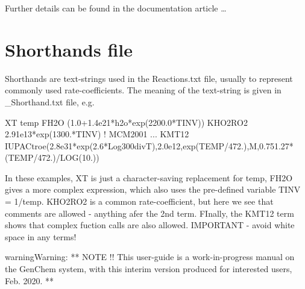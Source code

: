 \documentclass[a4paper,10pt,english]{sphinxmanual}
\begin{document}
Further details can be found in the documentation article …


\section{Shorthands file}
\label{\detokenize{GenChemDoc_chem:shorthands-file}}
Shorthands are text-strings used in the Reactions.txt file, usually to represent commonly used rate-coefficients. The meaning of the text-string is given in \_Shorthand.txt file, e.g.

\begin{sphinxVerbatim}[commandchars=\\\{\}]
XT           temp
FH2O         (1.0+1.4e\PYGZhy{}21*h2o*exp(2200.0*TINV))
KHO2RO2      2.91e\PYGZhy{}13*exp(1300.*TINV) ! MCM2001 ...
KMT12        IUPAC\PYGZus{}troe(2.8e\PYGZhy{}31*exp(2.6*Log300divT),2.0e\PYGZhy{}12,exp(\PYGZhy{}TEMP/472.),M,0.75\PYGZhy{}1.27*(\PYGZhy{}TEMP/472.)/LOG(10.))
\end{sphinxVerbatim}

In these examples, XT is just a character-saving replacement for temp, FH2O gives a more complex expression, which also uses the pre-defined variable TINV = 1/temp. KHO2RO2 is a common rate-coefficient, but here we see that comments are allowed - anything afer the 2nd term. FInally, the KMT12 term shows that complex fuction calls are also allowed. IMPORTANT - avoid white space in any terms!

\begin{sphinxadmonition}{warning}{Warning:}
**  NOTE !!
This user-guide is a work-in-progress manual on the GenChem system,
with this interim version produced for interested users, Feb. 2020.
**
\end{sphinxadmonition}
\end{document}
